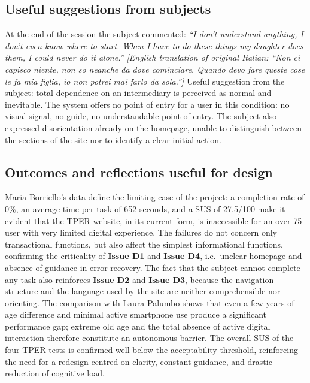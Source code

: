 ﻿\documentclass[11pt,a4paper]{article}
\begin{document}
\subsection*{Useful suggestions from subjects}
\begin{tcolorbox}[base]
At the end of the session the subject commented:
\textit{``I don't understand anything, I don't even know where to start. When I have to do these things my daughter does them, I could never do it alone.'' [English translation of original Italian: ``Non ci capisco niente, non so neanche da dove cominciare. Quando devo fare queste cose le fa mia figlia, io non potrei mai farlo da sola.'']}
Useful suggestion from the subject: total dependence on an intermediary
is perceived as normal and inevitable. The system offers
no point of entry for a user in this condition:
no visual signal, no guide, no
understandable point of
entry. The subject also expressed
disorientation already on the homepage, unable to
distinguish between the sections of the site nor to identify
a clear initial action.
\end{tcolorbox}
\subsection*{Outcomes and reflections useful for design}
\begin{tcolorbox}[base]
Maria Borriello's data define the limiting case of the project: a completion rate of 0\%, an average time per task of 652 seconds, and a SUS of 27.5/100 make it evident that the TPER website, in its current form, is inaccessible for an over-75 user with very limited digital experience. The failures do not concern only transactional functions, but also affect the simplest informational functions, confirming the criticality of \textbf{Issue \hyperref[iss:D1]{D1}} and \textbf{Issue \hyperref[iss:D4]{D4}}, i.e.\ unclear homepage and absence of guidance in error recovery. The fact that the subject cannot complete any task also reinforces \textbf{Issue \hyperref[iss:D2]{D2}} and \textbf{Issue \hyperref[iss:D3]{D3}}, because the navigation structure and the language used by the site are neither comprehensible nor orienting. The comparison with Laura Palumbo shows that even a few years of age difference and minimal active smartphone use produce a significant performance gap; extreme old age and the total absence of active digital interaction therefore constitute an autonomous barrier. The overall SUS of the four TPER tests is confirmed well below the acceptability threshold, reinforcing the need for a redesign centred on clarity, constant guidance, and drastic reduction of cognitive load.
\end{tcolorbox}
\newpage
\end{document}
